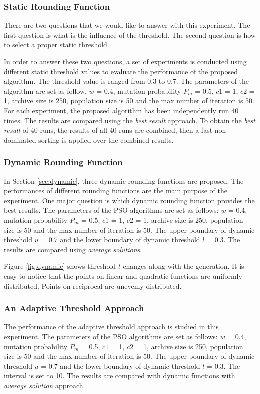 
\subsubsection{Static Rounding Function}
\label{sec:static_exp}
There are two questions that we would like to answer with this experiment. 
The first question is what is the influence of the threshold. The second question is how to select a proper static threshold. 

In order to answer these two questions, a set of experiments is conducted using different static threshold values to evaluate the performance of 
the proposed algorithm.
The threshold value is ranged from 0.3 to 0.7.  
The parameters of the algorithm are set as follow, $w$ = 0.4, mutation probability $P_m$ = 0.5, $c1$ = 1, $c2$ = 1, archive size is 250, population size is  50 and
the max number of iteration is 50. For each experiment, the proposed algorithm has been independently run 40 times. 
The results are compared using the \emph{best result} approach. To obtain the \emph{best result} of 40 runs, the results of all 40 runs are combined, 
then a fast non-dominated sorting is applied over the combined results. 
\subsubsection{Dynamic Rounding Function}
In Section \ref{sec:dynamic}, three dynamic rounding functions are proposed. 
The performances of different rounding functions are the main purpose of the experiment. One major question is which dynamic rounding function provides the 
best results.
The parameters of the PSO algorithms are set as follows: $w$ = 0.4, mutation probability $P_m$ = 0.5, $c1$ = 1, $c2$ = 1, archive size is 250, 
population size is 50 and
the max number of iteration is 50. The upper boundary of dynamic threshold $u$ = 0.7 and the lower boundary of dynamic threshold $l$ = 0.3. 
The results are compared using \emph{average solutions}.

Figure \ref{fig:dynamic} shows threshold $t$ changes along with the generation. It is easy to notice that the points on linear and quadratic functions are 
uniformly distributed. Points on reciprocal are unevenly distributed.

\subsubsection{An Adaptive Threshold Approach}
The performance of the adaptive threshold approach is studied in this experiment.
The parameters of the PSO algorithms are set as follows: $w$ = 0.4, mutation probability $P_m$ = 0.5, $c1$ = 1, $c2$ = 1, archive size is 250, 
population size is 50 and
the max number of iteration is 50. The upper boundary of dynamic threshold $u$ = 0.7 and the lower boundary of dynamic threshold $l$ = 0.3. 
The interval is set to 10. The results are compared with dynamic functions with \emph{average solution} approach.




